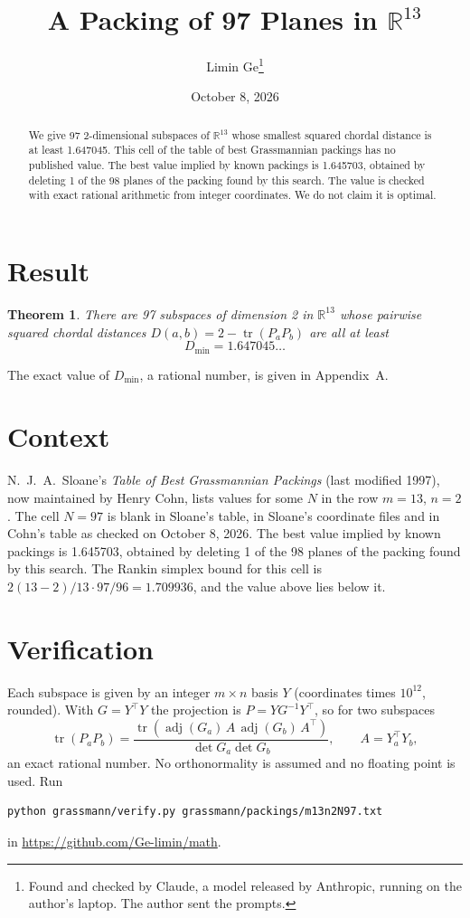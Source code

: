 \documentclass[11pt,a4paper]{article}
\title{A Packing of 97 Planes in $\mathbb{R}^{13}$}
\author{Limin Ge\thanks{Found and checked by Claude, a model released by Anthropic, running on the author's laptop. The author sent the prompts.}}
\date{October 8, 2026}
\newtheorem*{theorem}{Theorem}
\begin{document}
\maketitle
\begin{abstract}
We give 97 2-dimensional subspaces of $\mathbb{R}^{13}$ whose smallest squared chordal distance is at least 1.647045. This cell of the table of best Grassmannian packings has no published value. The best value implied by known packings is 1.645703, obtained by deleting 1 of the 98 planes of the packing found by this search. The value is checked with exact rational arithmetic from integer coordinates. We do not claim it is optimal.
\end{abstract}

\section{Result}
\begin{theorem}
There are 97 subspaces of dimension 2 in $\mathbb{R}^{13}$ whose pairwise squared chordal distances $D(a,b) = 2 - \operatorname{tr}(P_aP_b)$ are all at least
\[ D_{\min} = 1.647045\ldots \]
\end{theorem}
The exact value of $D_{\min}$, a rational number, is given in Appendix~A.


\section{Context}
N.~J.~A.~Sloane's \emph{Table of Best Grassmannian Packings} (last modified 1997), now maintained by Henry Cohn, lists values for some $N$ in the row $m=13$, $n=2$. The cell $N=97$ is blank in Sloane's table, in Sloane's coordinate files and in Cohn's table as checked on October 8, 2026. The best value implied by known packings is 1.645703, obtained by deleting 1 of the 98 planes of the packing found by this search. The Rankin simplex bound for this cell is $2(13-2)/13\cdot 97/96 = 1.709936$, and the value above lies below it.


\section{Verification}
Each subspace is given by an integer $m\times n$ basis $Y$ (coordinates times $10^{12}$, rounded). With $G=Y^\top Y$ the projection is $P=YG^{-1}Y^\top$, so for two subspaces
\[ \operatorname{tr}(P_aP_b)=\frac{\operatorname{tr}(\operatorname{adj}(G_a)\,A\,\operatorname{adj}(G_b)\,A^\top)}{\det G_a\det G_b},\qquad A=Y_a^\top Y_b, \]
an exact rational number. No orthonormality is assumed and no floating point is used. Run
\begin{verbatim}
python grassmann/verify.py grassmann/packings/m13n2N97.txt
\end{verbatim}
in \url{https://github.com/Ge-limin/math}.
\end{document}
